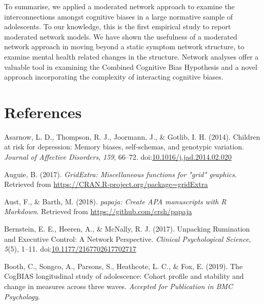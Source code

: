 \documentclass[man,floatsintext]{apa6}
\begin{document}
To summarise, we applied a moderated network approach to examine the interconnections amongst cognitive biases in a large normative sample of adolescents. To our knowledge, this is the first empirical study to report moderated network models. We have shown the usefulness of a moderated network approach in moving beyond a static symptom network structure, to examine mental health related changes in the structure. Network analyses offer a valuable tool in examining the Combined Cognitive Bias Hypothesis and a novel approach incorporating the complexity of interacting cognitive biases.

\newpage

\hypertarget{references}{%
\section{References}\label{references}}

\begingroup
\setlength{\parindent}{-0.5in}
\setlength{\leftskip}{0.5in}
\setlength{\parskip}{8pt}

\hypertarget{refs}{}
\leavevmode\hypertarget{ref-asarnow_children_2014}{}%
Asarnow, L. D., Thompson, R. J., Joormann, J., \& Gotlib, I. H. (2014). Children at risk for depression: Memory biases, self-schemas, and genotypic variation. \emph{Journal of Affective Disorders}, \emph{159}, 66--72. doi:\href{https://doi.org/10.1016/j.jad.2014.02.020}{10.1016/j.jad.2014.02.020}

\leavevmode\hypertarget{ref-R-gridExtra}{}%
Auguie, B. (2017). \emph{GridExtra: Miscellaneous functions for "grid" graphics}. Retrieved from \url{https://CRAN.R-project.org/package=gridExtra}

\leavevmode\hypertarget{ref-R-papaja}{}%
Aust, F., \& Barth, M. (2018). \emph{papaja: Create APA manuscripts with R Markdown}. Retrieved from \url{https://github.com/crsh/papaja}

\leavevmode\hypertarget{ref-bernstein_unpacking_2017}{}%
Bernstein, E. E., Heeren, A., \& McNally, R. J. (2017). Unpacking Rumination and Executive Control: A Network Perspective. \emph{Clinical Psychological Science}, \emph{5}(5), 1--11. doi:\href{https://doi.org/10.1177/2167702617702717}{10.1177/2167702617702717}

\leavevmode\hypertarget{ref-booth_cogbias_2019}{}%
Booth, C., Songco, A., Parsons, S., Heathcote, L. C., \& Fox, E. (2019). The CogBIAS longitudinal study of adolescence: Cohort profile and stability and change in measures across three waves. \emph{Accepted for Publication in BMC Psychology}.
\end{document}
